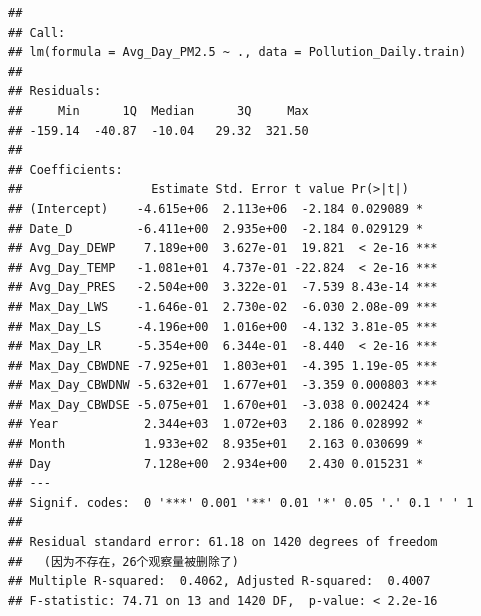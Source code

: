 \documentclass[
]{article}
\begin{document}
\begin{verbatim}
## 
## Call:
## lm(formula = Avg_Day_PM2.5 ~ ., data = Pollution_Daily.train)
## 
## Residuals:
##     Min      1Q  Median      3Q     Max 
## -159.14  -40.87  -10.04   29.32  321.50 
## 
## Coefficients:
##                  Estimate Std. Error t value Pr(>|t|)    
## (Intercept)    -4.615e+06  2.113e+06  -2.184 0.029089 *  
## Date_D         -6.411e+00  2.935e+00  -2.184 0.029129 *  
## Avg_Day_DEWP    7.189e+00  3.627e-01  19.821  < 2e-16 ***
## Avg_Day_TEMP   -1.081e+01  4.737e-01 -22.824  < 2e-16 ***
## Avg_Day_PRES   -2.504e+00  3.322e-01  -7.539 8.43e-14 ***
## Max_Day_LWS    -1.646e-01  2.730e-02  -6.030 2.08e-09 ***
## Max_Day_LS     -4.196e+00  1.016e+00  -4.132 3.81e-05 ***
## Max_Day_LR     -5.354e+00  6.344e-01  -8.440  < 2e-16 ***
## Max_Day_CBWDNE -7.925e+01  1.803e+01  -4.395 1.19e-05 ***
## Max_Day_CBWDNW -5.632e+01  1.677e+01  -3.359 0.000803 ***
## Max_Day_CBWDSE -5.075e+01  1.670e+01  -3.038 0.002424 ** 
## Year            2.344e+03  1.072e+03   2.186 0.028992 *  
## Month           1.933e+02  8.935e+01   2.163 0.030699 *  
## Day             7.128e+00  2.934e+00   2.430 0.015231 *  
## ---
## Signif. codes:  0 '***' 0.001 '**' 0.01 '*' 0.05 '.' 0.1 ' ' 1
## 
## Residual standard error: 61.18 on 1420 degrees of freedom
##   (因为不存在，26个观察量被删除了)
## Multiple R-squared:  0.4062, Adjusted R-squared:  0.4007 
## F-statistic: 74.71 on 13 and 1420 DF,  p-value: < 2.2e-16
\end{verbatim}
\end{document}

